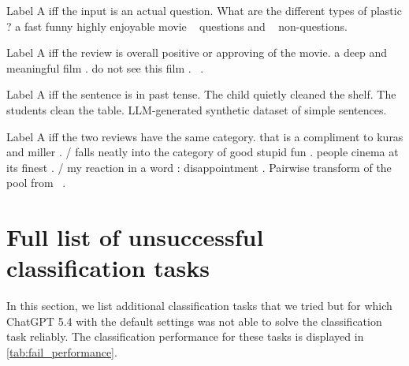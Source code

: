 \documentclass[11pt, letterpaper]{article}
\begin{document}
{Label A iff the input is an actual question.}
{What are the different types of plastic ?}
{a fast funny highly enjoyable movie}
{~\cite{li-roth-2002} questions and ~\cite{socher-etal-2013} non-questions.}

{Label A iff the review is overall positive or approving of the movie.}
{a deep and meaningful film .}
{do not see this film .}
{~\cite{socher-etal-2013}.}

{Label A iff the sentence is in past tense.}
{The child quietly cleaned the shelf.}
{The students clean the table.}
{LLM-generated synthetic dataset of simple sentences.}

{Label A iff the two reviews have the same  category.}
{that is a compliment to kuras and miller . / falls neatly into the category of good stupid fun .}
{people cinema at its finest . / my reaction in a word : disappointment .}
{Pairwise transform of the  pool from ~\cite{socher-etal-2013}.}

\section{Full list of unsuccessful classification tasks} \label{sec:failed_tasks}

In this section, we list additional classification tasks that we tried but for which ChatGPT 5.4 with the default settings was not able to solve the classification task reliably. The classification performance for these tasks is displayed in \cref{tab:fail_performance}.
\end{document}
